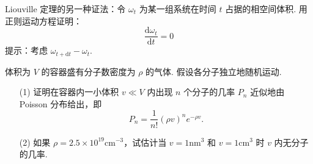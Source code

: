 \documentclass{assignment}
\begin{document}
\begin{prob}
    Liouville 定理的另一种证法：令 $\omega_t$ 为某一组系统在时间 $t$ 占据的相空间体积. 用正则运动方程证明：
    \[
        \frac{\mathrm{d}\omega_t}{\mathrm{d}t}=0
    \]
    提示：考虑 $\omega_{t+\mathrm{d}t}-\omega_t$.
\end{prob}
\begin{pf}
    
\end{pf}

\begin{prob}
    体积为 $V$ 的容器盛有分子数密度为 $\rho$ 的气体. 假设各分子独立地随机运动.
    \begin{itemize}
        \item[(1)] 证明在容器内一小体积 $v\ll V$ 内出现 $n$ 个分子的几率 $P_n$ 近似地由 Poisson 分布给出，即
        \[
            P_n=\frac{1}{n!}(\rho v)^ne^{-\rho v}.
        \]
        \item[(2)] 如果 $\rho=2.5\times 10^{19}\text{cm}^{-3}$，试估计当 $v=1\text{nm}^3$ 和 $v=1\text{cm}^3$ 时 $v$ 内无分子的几率.
    \end{itemize}
\end{prob}
\begin{sol}
    
\end{sol}
\end{document}

